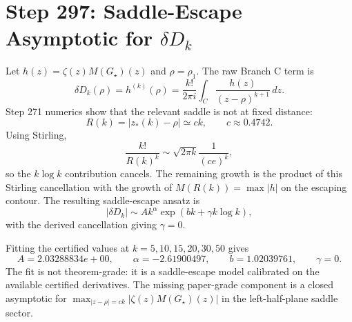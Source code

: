 \section*{Step 297: Saddle-Escape Asymptotic for $\delta D_k$}

Let $h(z)=\zeta(z)M(G_\star)(z)$ and $\rho=\rho_1$.  The raw Branch C term is
\[
  \delta D_k(\rho)=h^{(k)}(\rho)
  =\frac{k!}{2\pi i}\int_C \frac{h(z)}{(z-\rho)^{k+1}}\,dz.
\]
Step 271 numerics show that the relevant saddle is not at fixed distance:
\[
  R(k)=|z_\ast(k)-\rho|\simeq c k,\qquad c\approx 0.4742.
\]
Using Stirling,
\[
  \frac{k!}{R(k)^k}
  \sim \sqrt{2\pi k}\frac{1}{(ce)^k},
\]
so the $k\log k$ contribution cancels.  The remaining growth is the product of
this Stirling cancellation with the growth of $M(R(k))=\max |h|$ on the
escaping contour.  The resulting saddle-escape ansatz is
\[
  |\delta D_k|\sim A k^\alpha \exp(bk+\gamma k\log k),
\]
with the derived cancellation giving $\gamma=0$.

Fitting the certified values at $k=5,10,15,20,30,50$ gives
\[
  A=2.03288834e+00,\qquad
  \alpha=-2.61900497,\qquad
  b=1.02039761,\qquad
  \gamma=0.
\]
The fit is not theorem-grade: it is a saddle-escape model calibrated on the
available certified derivatives.  The missing paper-grade component is a
closed asymptotic for $\max_{|z-\rho|=ck}|\zeta(z)M(G_\star)(z)|$ in the
left-half-plane saddle sector.
